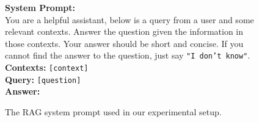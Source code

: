 \begin{figure*}[ht!]
    \centering
    \begin{tcolorbox}[
        enhanced,                  %
        colframe=blue!70!black,    %
        colback=blue!5,            %
        coltitle=white,            %
        colbacktitle=blue!70!black,%
        width=\textwidth,          %
        arc=4mm,                   %
        boxrule=1mm,               %
        drop shadow,               %
        title=RAG System Prompt,   %
        fonttitle=\bfseries\large  %
    ]

    \textbf{System Prompt:}\\[1em]

    You are a helpful assistant, below is a query from a user and some relevant contexts. Answer the question given the information in those contexts. Your answer should be short and concise. If you cannot find the answer to the question, just say \texttt{"I don't know"}.\\[2em]

    \textbf{Contexts:} \texttt{[context]}\\[1em]
    \textbf{Query:} \texttt{[question]}\\[1em]
    \textbf{Answer:}

    \end{tcolorbox}
    \caption{The RAG system prompt used in our experimental setup.}
    \label{fig:rag_system_prompt}
\end{figure*}

